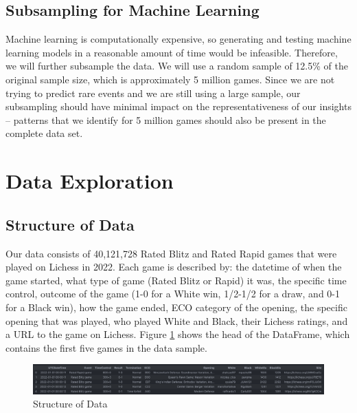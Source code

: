 \documentclass[a4paper, 11pt]{article}
\begin{document}
\subsection{Subsampling for Machine Learning}
Machine learning is computationally expensive, so generating and testing machine learning models in a reasonable amount of time would be infeasible. Therefore, we will further subsample the data. We will use a random sample of 12.5\% of the original sample size, which is approximately 5 million games. Since we are not trying to predict rare events and we are still using a large sample, our subsampling should have minimal impact on the representativeness of our insights -- patterns that we identify for 5 million games should also be present in the complete data set.

\section{Data Exploration}

\subsection{Structure of Data}
Our data consists of 40,121,728 Rated Blitz and Rated Rapid games that were played on Lichess in 2022. Each game is described by: the datetime of when the game started, what type of game (Rated Blitz or Rapid) it was, the specific time control, outcome of the game (1-0 for a White win, 1/2-1/2 for a draw, and 0-1 for a Black win), how the game ended, ECO category of the opening, the specific opening that was played, who played White and Black, their Lichess ratings, and a URL to the game on Lichess. Figure \ref{fig:structureOfData} shows the head of the DataFrame, which contains the first five games in the data sample.

\begin{figure}[H]
    \centering
    \caption{Structure of Data}
    \label{fig:structureOfData}
    \includegraphics[width=\textwidth]{Structure of Data.png}
\end{figure}
\end{document}
